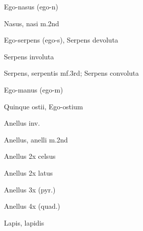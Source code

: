  {\mktsStyleItalic{}Ego-nasus\/} (ego-n)


 {\mktsStyleItalic{}Nasus\/}, nasi {\mktsStyleItalic{}m.2nd\/}


 {\mktsStyleItalic{}Ego-serpens\/} (ego-s), Serpens devoluta


 {\mktsStyleItalic{}Serpens involuta\/}


 {\mktsStyleItalic{}Serpens\/}, serpentis {\mktsStyleItalic{}mf.3rd\/}; {\mktsStyleItalic{}Serpens convoluta\/}


 {\mktsStyleItalic{}Ego-manus\/} (ego-m)


 {\mktsStyleItalic{}Quinque ostii\/}, {\mktsStyleItalic{}Ego-ostium\/}


 {\mktsStyleItalic{}Anellus inv.\/}


 {\mktsStyleItalic{}Anellus\/}, anelli {\mktsStyleItalic{}m.2nd\/}


 {\mktsStyleItalic{}Anellus 2x celsus\/}


 {\mktsStyleItalic{}Anellus 2x latus\/}


 {\mktsStyleItalic{}Anellus 3x (pyr.)\/}


 {\mktsStyleItalic{}Anellus 4x (quad.)\/}


 {\mktsStyleItalic{}Lapis\/}, lapidis



